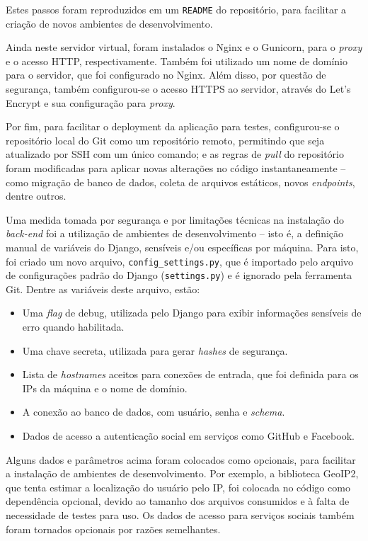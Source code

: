 \documentclass[]{politex}
\begin{document}
Estes passos foram reproduzidos em um \texttt{README} do repositório, para
facilitar a criação de novos ambientes de desenvolvimento.

Ainda neste servidor virtual, foram instalados o Nginx e o Gunicorn, para o
\textit{proxy} e o acesso HTTP, respectivamente. Também foi utilizado um nome de
domínio para o servidor, que foi configurado no Nginx. Além disso, por questão
de segurança, também configurou-se o acesso HTTPS ao servidor, através do Let's
Encrypt e sua configuração para \textit{proxy}.

Por fim, para facilitar o deployment da aplicação para testes, configurou-se
o repositório local do Git como um repositório remoto, permitindo que seja
atualizado por SSH com um único comando; e as regras de \textit{pull} do
repositório foram modificadas para aplicar novas alterações no código
instantaneamente -- como migração de banco de dados, coleta de arquivos
estáticos, novos \textit{endpoints}, dentre outros.

Uma medida tomada por segurança e por limitações técnicas na instalação do
\textit{back-end} foi a utilização de ambientes de desenvolvimento -- isto é,
a definição manual de variáveis do Django, sensíveis e/ou específicas por
máquina. Para isto, foi criado um novo arquivo, \texttt{config\_settings.py},
que é importado pelo arquivo de configurações padrão do Django
(\texttt{settings.py}) e é ignorado pela ferramenta Git. Dentre as variáveis
deste arquivo, estão:

\begin{itemize}
\item Uma \textit{flag} de debug, utilizada pelo Django para exibir informações
sensíveis de erro quando habilitada.
\item Uma chave secreta, utilizada para gerar \textit{hashes} de segurança.
\item Lista de \textit{hostnames} aceitos para conexões de entrada, que foi
definida para os IPs da máquina e o nome de domínio.
\item A conexão ao banco de dados, com usuário, senha e \textit{schema}.
\item Dados de acesso a autenticação social em serviços como GitHub e Facebook.
\end{itemize}

Alguns dados e parâmetros acima foram colocados como opcionais, para facilitar a
instalação de ambientes de desenvolvimento. Por exemplo, a biblioteca GeoIP2,
que tenta estimar a localização do usuário pelo IP, foi colocada no código como
dependência opcional, devido ao tamanho dos arquivos consumidos e à falta de
necessidade de testes para uso. Os dados de acesso para serviços sociais também
foram tornados opcionais por razões semelhantes.
\end{document}
